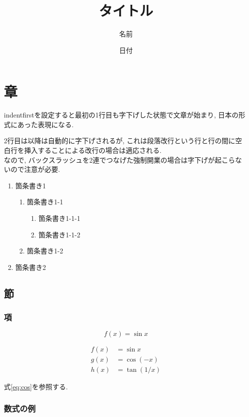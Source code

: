 \documentclass{jarticle}
\title{タイトル}
\author{名前}
\date{日付}
\begin{document}
\maketitle
\section{章}

indentfirstを設定すると最初の1行目も字下げした状態で文章が始まり, 日本の形式にあった表現になる.

2行目は以降は自動的に字下げされるが, これは段落改行という行と行の間に空白行を挿入することによる改行の場合は適応される.\\
なので, バックスラッシュを2連でつなげた強制開業の場合は字下げが起こらないので注意が必要.

\begin{enumerate}
  \item 箇条書き1
  \begin{enumerate}
    \item 箇条書き1-1
    \begin{enumerate}
      \item 箇条書き1-1-1
      \item 箇条書き1-1-2
    \end{enumerate}
    \item 箇条書き1-2
  \end{enumerate}
  \item 箇条書き2
\end{enumerate}
\subsection{節}
\subsubsection{項}

\begin{equation} \label{eq:a}
  f(x) = \sin x
\end{equation}

\begin{align}
  f(x) &= \sin x  \\
  g(x) &= \cos (-x) \label{eq:cos} \\
  h(x) &= \tan(1/x)
\end{align}

式\eqref{eq:cos}を参照する.
\subsubsection{数式の例}
\end{document}
